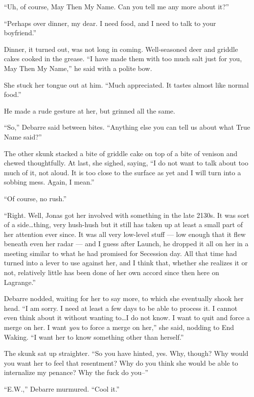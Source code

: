 ``Uh, of course, May Then My Name. Can you tell me any more about it?''

``Perhaps over dinner, my dear. I need food, and I need to talk to your boyfriend.''

Dinner, it turned out, was not long in coming. Well-seasoned deer and griddle cakes cooked in the grease. ``I have made them with too much salt just for you, May Then My Name,'' he said with a polite bow.

She stuck her tongue out at him. ``Much appreciated. It tastes almost like normal food.''

He made a rude gesture at her, but grinned all the same.

``So,'' Debarre said between bites. ``Anything else you can tell us about what True Name said?''

The other skunk stacked a bite of griddle cake on top of a bite of venison and chewed thoughtfully. At last, she sighed, saying, ``I do not want to talk about too much of it, not aloud. It is too close to the surface as yet and I will turn into a sobbing mess. Again, I mean.''

``Of course, no rush.''

``Right. Well, Jonas got her involved with something in the late 2130s. It was sort of a side\ldots thing, very hush-hush but it still has taken up at least a small part of her attention ever since. It was all very low-level stuff — low enough that it flew beneath even her radar — and I guess after Launch, he dropped it all on her in a meeting similar to what he had promised for Secession day. All that time had turned into a lever to use against her, and I think that, whether she realizes it or not, relatively little has been done of her own accord since then here on Lagrange.''

Debarre nodded, waiting for her to say more, to which she eventually shook her head. ``I am sorry. I need at least a few days to be able to process it. I cannot even think about it without wanting to\ldots I do not know. I want to quit and force a merge on her. I want \emph{you} to force a merge on her,'' she said, nodding to End Waking. ``I want her to know something other than herself.''

The skunk sat up straighter. ``So you have hinted, yes. Why, though? Why would you want her to feel that resentment? Why do you think she would be able to internalize my penance? Why the fuck do you--''

``E.W.,'' Debarre murmured. ``Cool it.''

